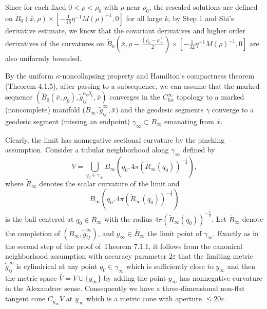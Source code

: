 Since for each fixed $0<\rho<\rho_0$ with $\rho$ near $\rho_0$,
the rescaled solutions are defined on
$\tilde{B}_{0}(\bar{x},\rho)\times
[-\frac{1}{16}\eta^{-1}M(\rho)^{-1},0]$ for all large $k$, by Step
1 and Shi's derivative estimate, we know that the covariant
derivatives and higher order derivatives of the curvatures on
$\tilde{B}_{0}(\bar{x},\rho -
\frac{(\rho_0-\rho)}{2})\times[-\frac{1}{32}\eta^{-1}M(\rho)^{-1},0]$
are also uniformly bounded.

By the uniform $\kappa$-noncollapsing property and Hamilton's
compactness theorem (Theorem 4.1.5), after passing to a
subsequence, we can assume that the marked sequence
$(\tilde{B}_0(\bar{x},\rho_0),\widetilde{g}^{\alpha_k\beta_k}_{ij},
\bar{x})$ converges in the $C^{\infty}_{loc}$ topology to a marked
(noncomplete) manifold
($B_{\infty},\widetilde{g}^{\infty}_{ij},\bar{x})$ and the
geodesic segments $\gamma$ converge to a geodesic segment (missing
an endpoint) $\gamma_{\infty}\subset B_{\infty}$ emanating from
$\bar{x}$.

Clearly, the limit has nonnegative sectional curvature by the
pinching assumption. Consider a tubular neighborhood along
$\gamma_{\infty}$ defined by
$$
V=\bigcup_{q_0\in\gamma_{\infty}}B_{\infty}
(q_0,4\pi(\widetilde{R}_{\infty}(q_0))^{-\frac{1}{2}}),
$$
where $\widetilde{R}_{\infty}$ denotes the scalar curvature of the
limit and
$$
B_{\infty}(q_0,4\pi(\widetilde{R}_{\infty}(q_0))^{-\frac{1}{2}})
$$
is the ball centered at $q_0\in B_{\infty}$ with the radius
$4\pi(\widetilde{R}_{\infty}(q_0))^{-\frac{1}{2}}$. Let
$\bar{B}_{\infty}$ denote the completion of
$(B_{\infty},\widetilde{g}^{\infty}_{ij})$, and
$y_{\infty}\in\bar{B}_{\infty}$ the limit point of
$\gamma_{\infty}$. Exactly as in the second step of the proof of
Theorem 7.1.1, it follows from the canonical neighborhood
assumption with accuracy parameter $2\varepsilon$ that the
limiting metric $\widetilde{g}^{\infty}_{ij}$ is cylindrical at
any point $q_0\in\gamma_{\infty}$ which is sufficiently close to
$y_{\infty}$ and then the metric space $\bar{V}=V\cup
\{y_{\infty}\}$ by adding the point $y_{\infty}$ has nonnegative
curvature in the Alexandrov sense. Consequently we have a
three-dimensional non-flat tangent cone $C_{y_{\infty}}\bar{V}$ at
$y_{\infty}$ which is a metric cone with aperture $\leq
20\varepsilon$.

